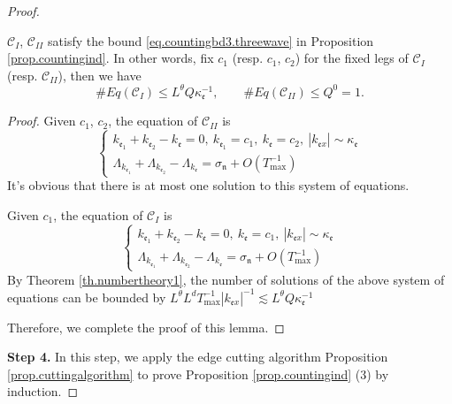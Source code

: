 \begin{proof}
\begin{lem}\label{lem.countingbdunit}
$\mathcal{C}_{I}$, $\mathcal{C}_{II}$ satisfy the bound \eqref{eq.countingbd3.threewave} in Proposition \ref{prop.countingind}. In other words, fix $c_1$ (resp. $c_1$, $c_2$) for the fixed legs of $\mathcal{C}_{I}$ (resp. $\mathcal{C}_{II}$), then we have 
\begin{equation}\label{eq.countingbdunit.threewave}
    \# Eq(\mathcal{C}_{I})\leq L^\theta Q\kappa^{-1}_{\mathfrak{e}},\qquad \# Eq(\mathcal{C}_{II})\leq Q^0=1.
\end{equation}
\end{lem}
\begin{proof} Given $c_1$, $c_2$, the equation of $\mathcal{C}_{II}$ is 
\begin{equation}
    \begin{cases}
    k_{\mathfrak{e}_1}+k_{\mathfrak{e}_2}-k_{\mathfrak{e}}=0,\ k_{\mathfrak{e}_1}=c_1,\ k_{\mathfrak{e}}=c_2,\ |k_{\mathfrak{e}x}|\sim \kappa_{\mathfrak{e}}
    \\
    \Lambda_{k_{\mathfrak{e}_1}}+\Lambda_{k_{\mathfrak{e}_2}}-\Lambda_{k_{\mathfrak{e}}}=\sigma_{\mathfrak{n}}+O(T^{-1}_{\text{max}})
    \end{cases}
\end{equation}
It's obvious that there is at most one solution to this system of equations.

Given $c_1$, the equation of $\mathcal{C}_{I}$ is 
\begin{equation}
    \begin{cases}
    k_{\mathfrak{e}_1}+k_{\mathfrak{e}_2}-k_{\mathfrak{e}}=0,\ k_{\mathfrak{e}}=c_1,\ |k_{\mathfrak{e}x}|\sim \kappa_{\mathfrak{e}}
    \\
    \Lambda_{k_{\mathfrak{e}_1}}+\Lambda_{k_{\mathfrak{e}_2}}-\Lambda_{k_{\mathfrak{e}}}=\sigma_{\mathfrak{n}}+O(T^{-1}_{\text{max}})
    \end{cases}
\end{equation}
By Theorem \ref{th.numbertheory1}, the number of solutions of the above system of equations can be bounded by $L^\theta L^dT^{-1}_{\text{max}}|k_{\mathfrak{e}x}|^{-1}\lesssim L^\theta Q\kappa^{-1}_{\mathfrak{e}}$

Therefore, we complete the proof of this lemma.
\end{proof}



\textbf{Step 4.} In this step, we apply the edge cutting algorithm Proposition \ref{prop.cuttingalgorithm} to prove Proposition \ref{prop.countingind} (3) by induction.


\end{proof}
